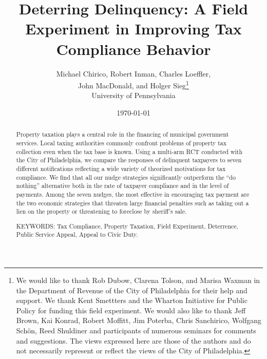 \documentclass[12pt]{article}
\renewcommand{\thefootnote}{\fnsymbol{footnote}}
\begin{document}
\title{Deterring Delinquency: A Field Experiment in Improving Tax Compliance Behavior}

\author{Michael Chirico, Robert Inman, Charles Loeffler, \\ 
John MacDonald, and Holger Sieg\thanks{We would like to thank Rob Dubow,
    Clarena Tolson, and Marisa Waxman in the Department of Revenue of
    the City of Philadelphia for their help and support. We thank Kent
    Smettters and the Wharton Initiative for Public Policy for funding
    this field experiment. We would also like to thank Jeff Brown, Kai
    Konrad, Robert Moffitt, Jim Poterba, Chris Sanchirico, Wolfgang
    Sch\"on, Reed Shuldiner and participants of numerous seminars for
    comments and suggestions. The views expressed here are those of
    the authors and do not necessarily represent or reflect the views
    of the City of Philadelphia.}  \\ 
University of Pennsylvania}

\date{\today}

\maketitle

\begin{abstract}

Property taxation plays a central role in the financing of municipal
government services. Local taxing authorities commonly confront
problems of property tax collection even when the tax base is known.
Using a multi-arm RCT conducted with the City of Philadelphia, we
compare the responses of delinquent taxpayers to seven different
notifications reflecting a wide variety of theorized motivations for
tax compliance. We find that all our nudge strategies significantly
outperform the ``do nothing'' alternative both in the rate of taxpayer
compliance and in the level of payments.  Among the seven nudges, the
most effective in encouraging tax payment are the two economic
strategies that threaten large financial penalties such as taking out
a lien on the property or threatening to foreclose by sheriff's sale.

\bigskip

\noindent KEYWORDS: Tax Compliance, Property Taxation, Field
Experiment, Deterrence, Public Service Appeal, Appeal to Civic Duty.

\end{abstract}
\renewcommand{\thefootnote}{\arabic{footnote}}

\newpage
\end{document}
